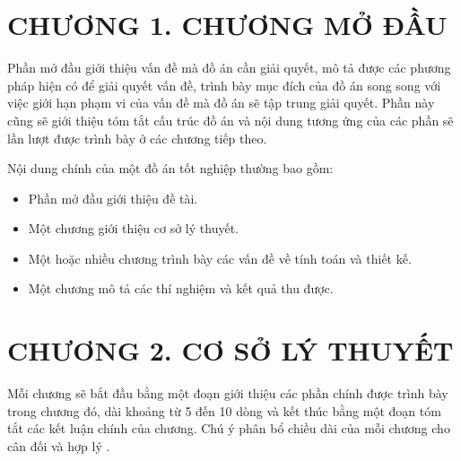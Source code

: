 \documentclass{article} %
\begin{document}




\tableofcontents 
\thispagestyle{empty}
\cleardoublepage


{\let\oldnumberline\numberline
\renewcommand{\numberline}{Hình~\oldnumberline}
\listoffigures} 
\newpage

{\let\oldnumberline\numberline
\renewcommand{\numberline}{Bảng~\oldnumberline}
\listoftables}
\newpage


\section*{CHƯƠNG 1.  CHƯƠNG MỞ ĐẦU}
Phần mở đầu giới thiệu vấn đề mà đồ án cần giải quyết, mô tả được các phương pháp hiện có để giải quyết vấn đề, trình bày mục đích của đồ án song song với việc giới hạn phạm vi của vấn đề mà đồ án sẽ tập trung giải quyết. Phần này cũng sẽ giới thiệu tóm tắt cấu trúc đồ án và nội dung tương ứng của các phần sẽ lần lượt được trình bày ở các chương tiếp theo.

Nội dung chính của một đồ án tốt nghiệp thường bao gồm:
\begin{itemize}
    \item Phần mở đầu giới thiệu đề tài.
    \item Một chương giới thiệu cơ sở lý thuyết.
    \item Một hoặc nhiều chương trình bày các vấn đề về tính toán và thiết kế.
    \item Một chương mô tả các thí nghiệm và kết quả thu được.
\end{itemize}
\newpage

\section*{CHƯƠNG 2.  CƠ SỞ LÝ THUYẾT}
\setcounter{section}{2}
\setcounter{figure}{0}
\setcounter{table}{0}
Mỗi chương sẽ bắt đầu bằng một đoạn giới thiệu các phần chính được trình bày trong chương đó, dài khoảng từ 5 đến 10 dòng và kết thúc bằng một đoạn tóm tắt các kết luận chính của chương. Chú ý phân bổ chiều dài của mỗi chương cho cân đối và hợp lý \cite{yoon2018resource}.
\end{document}
